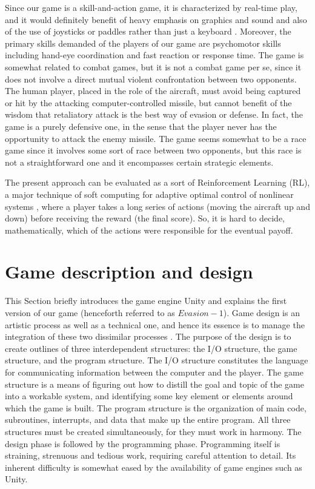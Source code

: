 Since our game is a skill-and-action game, it is characterized by real-time play, and it would definitely benefit of heavy emphasis on graphics and sound and also of the use of joysticks or paddles rather than just a keyboard \cite{crawford1984art}. Moreover, the primary skills demanded of the players of our game are psychomotor skills including hand-eye coordination and fast reaction or response time. The game is somewhat related to combat games, but it is not a combat game per se, since it does not involve a direct mutual violent confrontation between two opponents. The human player, placed in the role of the aircraft, must avoid being captured or hit by the attacking computer-controlled missile, but cannot benefit of the wisdom that retaliatory attack is the best way of evasion or defense.  In fact, the game is a purely defensive one, in the sense that the player never has the opportunity to attack the enemy missile. The game seems somewhat to be a race game since it involves some sort of race between two opponents, but this race is not a straightforward one and it encompasses certain strategic elements.

The present approach can be evaluated as a sort of Reinforcement Learning (RL), a major technique of soft computing for adaptive optimal control of nonlinear systems \cite{liu2009pursuit,sharma2010synergizing,doya2000reinforcement}, where a player takes a long series of actions (moving the aircraft up and down) before receiving the reward (the final score). So, it is hard to decide, mathematically, which of the actions were responsible for the eventual payoff.


\section{Game description and design}

This Section briefly introduces the game engine Unity and explains the first version of our game (henceforth referred to as $Evasion-1$). 
Game design is an artistic process as well as a technical one, and hence its essence is to manage the integration of these two dissimilar processes \cite{crawford1984art}. The purpose of the design is to create outlines of three interdependent structures: the I/O structure, the game structure, and the program structure. The I/O structure constitutes the language for communicating information between the computer and the player. The game structure is a means of figuring out how to distill the goal and topic of the game into a workable system, and identifying some key element or elements around which the game is built. The program structure is the organization of main code, subroutines, interrupts, and data that make up the entire program. All three structures must be created simultaneously, for they must work in harmony. The design phase is followed by the programming phase. 
Programming itself is straining, strenuous and tedious work, requiring careful attention to detail. Its inherent difficulty is somewhat eased by the availability of game engines such as Unity. 

